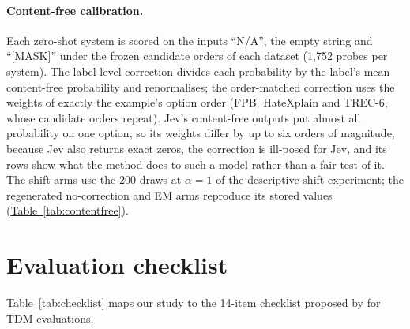 \paragraph{Content-free calibration.} Each zero-shot system is scored on the inputs ``N/A'', the empty string and
``[MASK]'' under the frozen candidate orders of each dataset (1{,}752 probes per system). The label-level correction
divides each probability by the label's mean content-free probability and renormalises; the order-matched correction
uses the weights of exactly the example's option order (FPB, HateXplain and TREC-6, whose candidate orders repeat).
Jev's content-free outputs put almost all probability on one option, so its weights differ by up to six orders of
magnitude; because Jev also returns exact zeros, the correction is ill-posed for Jev, and its rows show what the method
does to such a model rather than a fair test of it. The shift arms use the 200 draws at $\alpha=1$ of the descriptive
shift experiment; the regenerated no-correction and EM arms reproduce its stored values (\hyperref[tab:contentfree]{Table~\ref*{tab:contentfree}}).

\begin{table}[htbp]
  \centering
  \caption{\textbf{Content-free calibration lowers Macro-F1 on FPB and HateXplain and does not improve on EM with the
  implicit prior under shift (exploratory).} Macro-F1 on the full test split and ECE under shift ($\alpha=1$, mean over
  200 draws). --: not applicable (no-shift columns for EM arms; order-matched weights only where candidate orders
  repeat).}
  \label{tab:contentfree}
  \scriptsize
  \setlength{\tabcolsep}{2.5pt}
  \resizebox{\linewidth}{!}{}
\end{table}

\FloatBarrier
\section{Evaluation checklist}
\label{app:checklist}
\hyperref[tab:checklist]{Table~\ref*{tab:checklist}} maps our study to the 14-item checklist proposed by \citet{tang2026audit} for TDM
evaluations.

